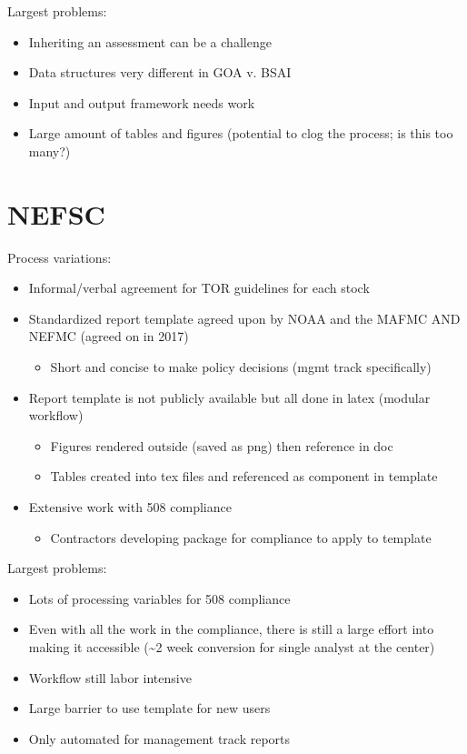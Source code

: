 \documentclass[
  letterpaper,
  oneside,
  open=any]{scrbook}
\providecommand{\tightlist}{%
  \setlength{\itemsep}{0pt}\setlength{\parskip}{0pt}}\usepackage{longtable,booktabs,array}
\begin{document}
Largest problems:

\begin{itemize}
\item
  Inheriting an assessment can be a challenge
\item
  Data structures very different in GOA v. BSAI
\item
  Input and output framework needs work
\item
  Large amount of tables and figures (potential to clog the process; is
  this too many?)
\end{itemize}

\section{NEFSC}\label{sec-nefsc}

Process variations:

\begin{itemize}
\item
  Informal/verbal agreement for TOR guidelines for each stock
\item
  Standardized report template agreed upon by NOAA and the MAFMC AND
  NEFMC (agreed on in 2017)

  \begin{itemize}
  \tightlist
  \item
    Short and concise to make policy decisions (mgmt track specifically)
  \end{itemize}
\item
  Report template is not publicly available but all done in latex
  (modular workflow)

  \begin{itemize}
  \item
    Figures rendered outside (saved as png) then reference in doc
  \item
    Tables created into tex files and referenced as component in
    template
  \end{itemize}
\item
  Extensive work with 508 compliance

  \begin{itemize}
  \tightlist
  \item
    Contractors developing package for compliance to apply to template
  \end{itemize}
\end{itemize}

Largest problems:

\begin{itemize}
\item
  Lots of processing variables for 508 compliance
\item
  Even with all the work in the compliance, there is still a large
  effort into making it accessible (\textasciitilde2 week conversion for
  single analyst at the center)
\item
  Workflow still labor intensive
\item
  Large barrier to use template for new users
\item
  Only automated for management track reports
\end{itemize}
\end{document}
